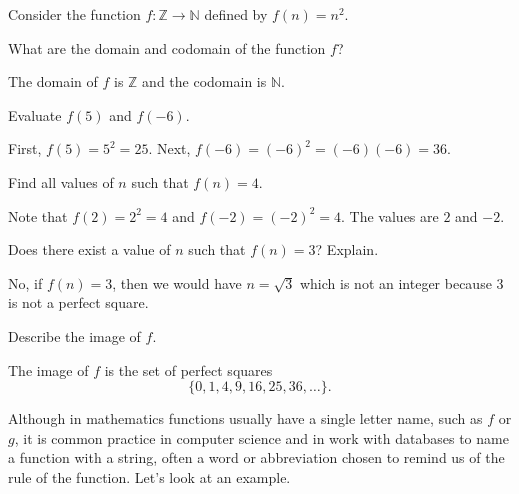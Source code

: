 \begin{exam}
\label{exam_square_function}
    Consider the function $f: \mathbb{Z} \to \mathbb{N}$ defined by $f(n) = n^2$.
        \begin{apart}
            \item What are the domain and codomain of the function $f$?
                \begin{soln}
                    The domain of $f$ is $\mathbb{Z}$ and the codomain is $\mathbb{N}$.
                \end{soln}
            \item Evaluate $f(5)$ and $f(-6)$.
                \begin{soln}
                    First, $f(5) = 5^2=25$.  Next, $f(-6) = (-6)^2=(-6)(-6)=36$.
                \end{soln}
            \item Find all values of $n$ such that $f(n) = 4$.
                \begin{soln}
                    Note that $f(2) = 2^2=4$ and $f(-2) = (-2)^2=4$.  The values are $2$ and $-2$.
                \end{soln}            
            \item Does there exist a value of $n$ such that $f(n)=3$?  Explain.
                \begin{soln}
                    No, if $f(n)=3$, then we would have $n = \sqrt{3}$ which is not an integer because 3 is not a perfect square. 
                \end{soln}
            \item Describe the image of $f$.
                \begin{soln}
                    The image of $f$ is the set of perfect squares
                        $$\{0,1,4,9,16,25,36, \ldots\}.$$
                \end{soln}
        \end{apart}    
\end{exam}

Although in mathematics functions usually have a single letter name, such as $f$ or $g$, it is common practice in computer science and in work with databases to name a function with a string, often a word or abbreviation chosen to remind us of the rule of the function. Let's look at an example.

